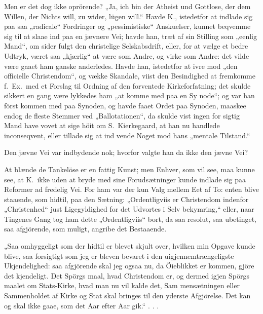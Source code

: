\documentclass[12pt,a4paper]{article}
\newcommand{\opage}[1]{\marginnote{\footnotesize\textit{[#1]}}}
\begin{document}
Men er det dog ikke oprörende? „Ja, ich bin der
Atheist und Gottlose, der dem Willen, der Nichts will, zu\-%
wider, lügen will.“ Havde K., istedetfor at indlade sig paa
saa „radicale“ Fordringer og „pessimistiske“ Anskuelser,
kunnet beqvemme sig til at slaae ind paa en jævnere Vei;
havde han, træt af sin Stilling som „eenlig Mand“, om\-%
sider fulgt den christelige Selskabsdrift, eller, for at vælge
et bedre Udtryk, været saa „kjærlig“ at være som Andre,
og virke som Andre: det vilde være gaaet ham ganske
anderledes. Havde han, istedetfor at ivre mod „den
officielle Christendom“, og vække Skandale, viist den
Besindighed at fremkomme f.\ Ex.\ med et Forslag til Ordning
af den forventede Kirkeforfatning; det skulde sikkert en\-%
gang være lykkedes ham „at komme med paa en Sy\-%
node“; og var han först kommen med paa Synoden, og
havde faaet Ordet paa Synoden, maaskee endog de fleste
Stemmer ved „Ballotationen“, da skulde vist ingen for\-%
sigtig Mand have vovet at sige höit om S.\ Kierkegaard,
at han nu handlede inconseqvent, eller tillade sig at ind\-%
vende Noget mod hans „mentale Tilstand.“

\opage{27} Den jævne Vei var indbydende nok; hvorfor valgte
han da ikke den jævne Vei?

At blænde de Tankelöse er en fattig Kunst; men
Enhver, som vil see, maa kunne see, at K.\ ikke uden
at bryde med sine Forudsætninger kunde indlade sig paa
Reformer ad fredelig Vei. For ham var der kun Valg
mellem Eet af To: enten blive staaende, som hidtil, paa
den Sætning: „Ordentligviis er Christendom indenfor
„Christenhed“ just Ligegyldighed for det Udvortes i Selv\-%
bekymring,“ eller, naar Tingenes Gang tog ham dette
„Ordentligviis“ bort, da saa resolut, saa ubetinget, saa
afgjörende, som muligt, angribe det Bestaaende.

„Saa omhyggeligt som der hidtil er blevet skjult
over, hvilken min Opgave kunde blive, saa forsigtigt
som jeg er bleven bevaret i den uigjennemtrængeligste
Ukjendelighed: saa afgjörende skal jeg ogsaa nu, da
Öieblikket er kommen, gjöre det kjendeligt. Det Spörgs\-%
maal, hvad Christendom er, og dermed igjen Spörgs\-%
maalet om Stats-Kirke, hvad man nu vil kalde det, Sam\-%
mensætningen eller Sammenholdet af Kirke og Stat skal
bringes til den yderste Afgjörelse. Det kan og skal ikke
gaae, som det Aar efter Aar gik.“ . . .
\end{document}
